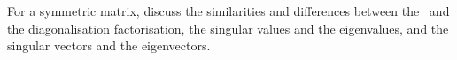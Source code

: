 \begin{exercise} \label{ex:} 
For a symmetric matrix, discuss the similarities and differences between the \svd\ and the diagonalisation factorisation, the singular values and the eigenvalues, and the singular vectors and the eigenvectors.
\end{exercise}



\begin{comment}%
why, what caused X?
how did X occur?
what-if? what-if-not?
how does X compare with Y?
what is the evidence for X?
why is X important?
\end{comment}


